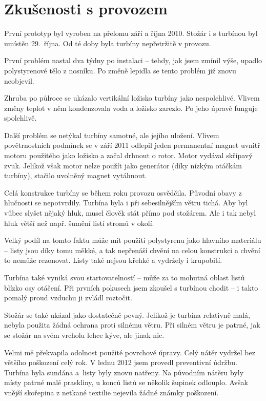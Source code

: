 \chapter{Zkušenosti s provozem}

První prototyp byl vyroben na přelomu září a října 2010. Stožár i s turbínou byl umístěn 29.~října. Od té doby byla turbíny nepřetržitě v provozu.

První problém nastal dva týdny po instalaci – tehdy, jak jsem zmínil výše, upadlo polystyrenové tělo z nosníku. Po změně lepidla se tento problém již znovu neobjevil.

Zhruba po půlroce se ukázalo vertikální ložisko turbíny jako nespolehlivé. Vlivem změny teplot v něm kondenzovala voda a ložisko zarezlo. Po jeho úpravě funguje spolehlivě.

Další problém se netýkal turbíny samotné, ale jejího uložení. Vlivem povětrnostních podmínek se v září 2011 odlepil jeden permanentní magnet uvnitř motoru použitého jako ložisko a začal drhnout o rotor. Motor vydával skřípavý zvuk. Jelikož však motor nelze použít jako generátor (díky nízkým otáčkám turbíny), stačilo uvolněný magnet vytáhnout.

Celá konstrukce turbíny se během roku provozu osvědčila. Původní obavy z hlučnosti se nepotvrdily. Turbína byla i při sebesilnějším větru tichá. Aby byl vůbec slyšet nějaký hluk, musel člověk stát přímo pod stožárem. Ale i tak nebyl hluk větší než např. šumění listí stromů v okolí.

Velký podíl na tomto faktu může mít použití polystyrenu jako hlavního materiálu – listy jsou díky tomu měkké, a tak nepřenáší chvění na celou konstrukci a chvění to nemůže rezonovat. Listy také nejsou křehké a vydržely i krupobití.

Turbína také vyniká svou startovatelností – může za to mohutná oblast listů blízko osy otáčení. Při prvních pokusech jsem zkoušel s turbínou chodit – i takto pomalý proud vzduchu ji zvládl roztočit.

Stožár se také ukázal jako dostatečně pevný. Jelikož je turbína relativně malá, nebyla použita žádná ochrana proti silnému větru. Při silném větru je patrné, jak se stožár na svém vrcholu lehce kýve, ale jinak nic.

Velmi mě překvapila odolnost použité povrchové úpravy. Celý nátěr vydržel bez většího poškození celý rok. V lednu 2012 jsem provedl preventivní údržbu. Turbína byla sundána a~listy byly znovu natřeny. Na původním nátěru byly místy patrné malé praskliny, u konců listů se několik šupinek odlouplo. Avšak vnější skořepina z netkané textilie nejevila žádné známky poškození.


